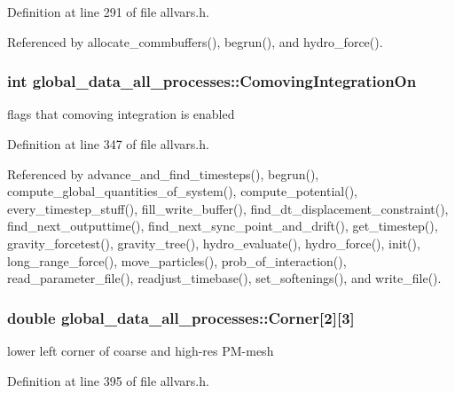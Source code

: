 Definition at line 291 of file allvars.h.



Referenced by allocate\_\-commbuffers(), begrun(), and hydro\_\-force().

\hypertarget{structglobal__data__all__processes_a4104c753df69fb4da0dd9bbb57e2a5f4}{
\subsubsection[{ComovingIntegrationOn}]{\setlength{\rightskip}{0pt plus 5cm}int {\bf global\_\-data\_\-all\_\-processes::ComovingIntegrationOn}}}
\label{structglobal__data__all__processes_a4104c753df69fb4da0dd9bbb57e2a5f4}
flags that comoving integration is enabled 

Definition at line 347 of file allvars.h.



Referenced by advance\_\-and\_\-find\_\-timesteps(), begrun(), compute\_\-global\_\-quantities\_\-of\_\-system(), compute\_\-potential(), every\_\-timestep\_\-stuff(), fill\_\-write\_\-buffer(), find\_\-dt\_\-displacement\_\-constraint(), find\_\-next\_\-outputtime(), find\_\-next\_\-sync\_\-point\_\-and\_\-drift(), get\_\-timestep(), gravity\_\-forcetest(), gravity\_\-tree(), hydro\_\-evaluate(), hydro\_\-force(), init(), long\_\-range\_\-force(), move\_\-particles(), prob\_\-of\_\-interaction(), read\_\-parameter\_\-file(), readjust\_\-timebase(), set\_\-softenings(), and write\_\-file().

\hypertarget{structglobal__data__all__processes_a5ffb63ff788ca6eee831b5d4d0d9e150}{
\subsubsection[{Corner}]{\setlength{\rightskip}{0pt plus 5cm}double {\bf global\_\-data\_\-all\_\-processes::Corner}\mbox{[}2\mbox{]}\mbox{[}3\mbox{]}}}
\label{structglobal__data__all__processes_a5ffb63ff788ca6eee831b5d4d0d9e150}
lower left corner of coarse and high-\/res PM-\/mesh 

Definition at line 395 of file allvars.h.


